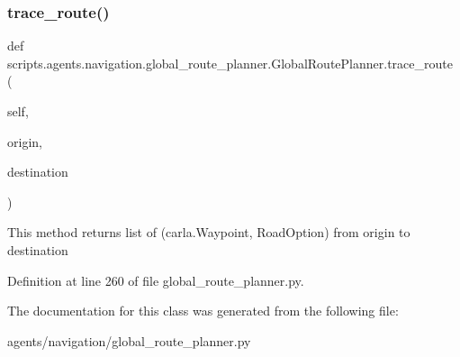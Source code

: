 \subsubsection{\texorpdfstring{trace\+\_\+route()}{trace\_route()}}
{\footnotesize\ttfamily def scripts.\+agents.\+navigation.\+global\+\_\+route\+\_\+planner.\+Global\+Route\+Planner.\+trace\+\_\+route (\begin{DoxyParamCaption}\item[{}]{self,  }\item[{}]{origin,  }\item[{}]{destination }\end{DoxyParamCaption})}

\begin{DoxyVerb}This method returns list of (carla.Waypoint, RoadOption) from origin to destination
\end{DoxyVerb}
 

Definition at line 260 of file global\+\_\+route\+\_\+planner.\+py.



The documentation for this class was generated from the following file\+:\begin{DoxyCompactItemize}
\item 
agents/navigation/global\+\_\+route\+\_\+planner.\+py\end{DoxyCompactItemize}
